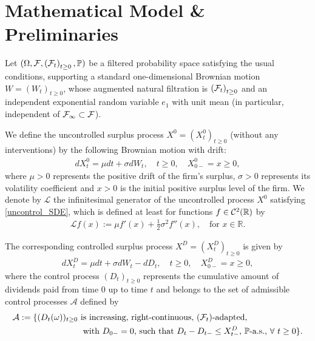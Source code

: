 \documentclass[11pt]{article} %
\def\F{\mathcal F}
\def\R{\mathbb{R}}
\numberwithin{komcounter}{section}
\numberwithin{equation}{section}
\numberwithin{theorem}{section}
\begin{document}
\section{Mathematical Model \& Preliminaries}
\label{sec_math_model}

Let  $(\Omega, \F, \left({\cal F}_t\right)_{t\geq 0}, \mathbb{P})$ be a filtered probability space satisfying the usual conditions, supporting a standard one-dimensional Brownian motion $W=\left(W_t\right)_{t\geq0}$, whose augmented natural filtration is $\left({\cal F}_t\right)_{t\geq 0}$
and an independent exponential random variable $e_1$ with unit mean (in particular, independent of ${\cal F}_\infty \subset \mathcal{F}$). 



We define the uncontrolled surplus process $X^0=(X_t^0)_{t\geq 0}$ (without any interventions) by the following Brownian motion with drift: 
\begin{align} \label{uncontrol_SDE}
dX_t^0=\mu dt+ \sigma dW_t, \quad t\geq 0, \quad X^0_{0-} = x\geq 0, 
\end{align}
where $\mu>0$ represents the positive drift of the firm's surplus, $\sigma>0$ represents its volatility coefficient and $x>0$ is the initial positive surplus level of the firm. 
We denote by $\mathcal{L}$ the infinitesimal generator of the uncontrolled process $X^0$ satisfying \eqref{uncontrol_SDE}, which is defined at least for functions $f \in {\cal C}^2(\R)$ by
\begin{align*}
\mathcal{L} f(x) := \mu f'(x) + \frac{1}{2} \sigma^2 f''(x), 
\quad \text{for } x \in \R.
\end{align*}

The corresponding controlled surplus process $X^D=(X^D_t)_{t\geq 0}$ is given by 
\begin{align} \label{control_SDE} 
dX_t^D = \mu dt+ \sigma dW_t -dD_t, \quad t\geq 0, \quad X^D_{0-}=x\geq 0, 
\end{align}
where the control process $(D_t)_{t\geq0}$ represents the cumulative amount of dividends paid from time $0$ up to time $t$ and belongs to the set of admissible control processes $\mathcal{A}$ defined by 
\begin{align} \label{adm}
\begin{split}
\mathcal{A} := \{ (D_t(\omega))_{t\geq0} &\text{ is increasing, right-continuous, $\left({\cal F}_t\right)$-adapted,}\\
&\; \text{ with $D_{0-}=0$, such that  $D_{t}-D_{t-} \leq X_{t-}^D$, $\mathbb{P}$-a.s., $\forall$ $t \geq 0$\}}.
\end{split}
\end{align}
\end{document}
